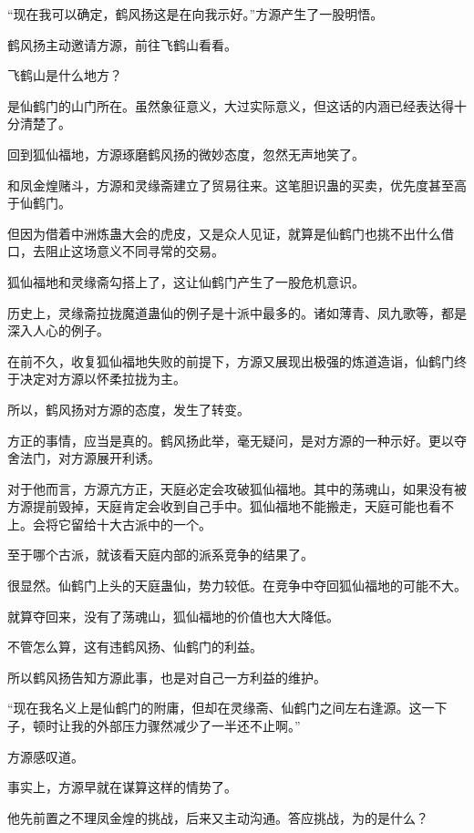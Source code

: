 
\begin{this_body}

“现在我可以确定，鹤风扬这是在向我示好。”方源产生了一股明悟。

鹤风扬主动邀请方源，前往飞鹤山看看。

飞鹤山是什么地方？

是仙鹤门的山门所在。虽然象征意义，大过实际意义，但这话的内涵已经表达得十分清楚了。

回到狐仙福地，方源琢磨鹤风扬的微妙态度，忽然无声地笑了。

和凤金煌赌斗，方源和灵缘斋建立了贸易往来。这笔胆识蛊的买卖，优先度甚至高于仙鹤门。

但因为借着中洲炼蛊大会的虎皮，又是众人见证，就算是仙鹤门也挑不出什么借口，去阻止这场意义不同寻常的交易。

狐仙福地和灵缘斋勾搭上了，这让仙鹤门产生了一股危机意识。

历史上，灵缘斋拉拢魔道蛊仙的例子是十派中最多的。诸如薄青、凤九歌等，都是深入人心的例子。

在前不久，收复狐仙福地失败的前提下，方源又展现出极强的炼道造诣，仙鹤门终于决定对方源以怀柔拉拢为主。

所以，鹤风扬对方源的态度，发生了转变。

方正的事情，应当是真的。鹤风扬此举，毫无疑问，是对方源的一种示好。更以夺舍法门，对方源展开利诱。

对于他而言，方源亢方正，天庭必定会攻破狐仙福地。其中的荡魂山，如果没有被方源提前毁掉，天庭肯定会收到自己手中。狐仙福地不能搬走，天庭可能也看不上。会将它留给十大古派中的一个。

至于哪个古派，就该看天庭内部的派系竞争的结果了。

很显然。仙鹤门上头的天庭蛊仙，势力较低。在竞争中夺回狐仙福地的可能不大。

就算夺回来，没有了荡魂山，狐仙福地的价值也大大降低。

不管怎么算，这有违鹤风扬、仙鹤门的利益。

所以鹤风扬告知方源此事，也是对自己一方利益的维护。

“现在我名义上是仙鹤门的附庸，但却在灵缘斋、仙鹤门之间左右逢源。这一下子，顿时让我的外部压力骤然减少了一半还不止啊。”

方源感叹道。

事实上，方源早就在谋算这样的情势了。

他先前置之不理凤金煌的挑战，后来又主动沟通。答应挑战，为的是什么？


\end{this_body}
